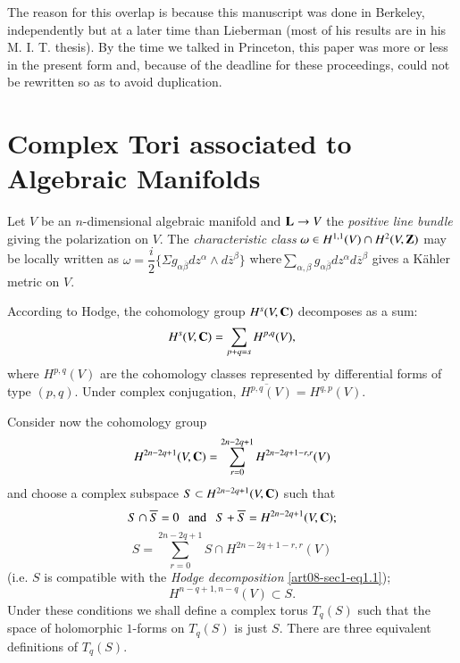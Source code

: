 The reason for this overlap is because this manuscript was done in Berkeley, independently but at a later time than Lieberman (most of his results are in his M. I. T. thesis). By the time we talked in Princeton, this paper was more or less in the present form and, because of the deadline for these proceedings, could not be rewritten so as to avoid duplication.


\tableofcontents

\section{Complex Tori associated to Algebraic Manifolds}\label{art08-sec1}\pageoriginale

Let $V$ be an $n$-dimensional algebraic manifold and $\mathbf{L}\to V$ the {\em positive line bundle} giving the polarization on $V$. The {\em characteristic class} $\omega \in H^{1,1}(V)\cap H^{2}(V,\mathbf{Z})$ may be locally written as $\omega=\dfrac{i}{2}\{\Sigma g_{\alpha\overline{\beta}}dz^{\alpha}\wedge d\overline{z}^{\beta}\}$ where\pageoriginale $\sum\limits_{\alpha,\beta}g_{\alpha\overline{\beta}}dz^{\alpha}d\overline{z}^{\beta}$ gives a K\"ahler metric on $V$.

According to Hodge, the cohomology group $H^{s}(V,\mathbf{C})$ decomposes as a sum:
$$
H^{s}(V,\mathbf{C})=\sum\limits_{p+q=s}H^{p,q}(V),
$$
where $H^{p,q}(V)$ are the cohomology classes represented by differential forms of type $(p,q)$. Under complex conjugation, $\overline{H^{p,q}(V)}=H^{q,p}(V)$. 

Consider now the cohomology group
\begin{equation}
H^{2n-2q+1}(V,\mathbf{C})=\sum\limits^{2n-2q+1}_{r=0}H^{2n-2q+1-r,r}(V)\label{art08-sec1-eq1.1}
\end{equation}
and choose a complex subspace $S\subset H^{2n-2q+1}(V,\mathbf{C})$ such that
\begin{equation}
S\cap \overline{S}=0\text{~~ and ~~} S+\overline{S}=H^{2n-2q+1}(V,\mathbf{C});\label{art08-sec1-eq1.2}
\end{equation}
\begin{equation}
S=\sum\limits^{2n-2q+1}_{r=0}S\cap H^{2n-2q+1-r,r}(V)\label{art08-sec1-eq1.3}
\end{equation}
(i.e. $S$ is compatible with the {\em Hodge decomposition} \eqref{art08-sec1-eq1.1});
\begin{equation}
H^{n-q+1,n-q}(V)\subset S.\label{art08-sec1-eq1.4}
\end{equation}
Under these conditions we shall define a complex torus $T_{q}(S)$ such that the space of holomorphic $1$-forms on $T_{q}(S)$ is just $S$. There are three equivalent definitions of $T_{q}(S)$.

